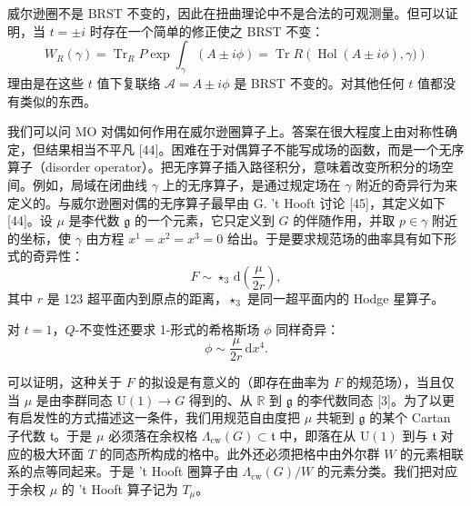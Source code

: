 \documentclass[11pt,a4paper,UTF8]{ctexart}
\begin{document}
威尔逊圈不是 BRST 不变的，因此在扭曲理论中不是合法的可观测量。但可以证明，当 $t=\pm i$ 时存在一个简单的修正使之 BRST 不变：
\[
    W_{R}(\gamma) = \operatorname{Tr}_{R} P\exp\int_{\gamma}(A\pm i\phi)
    = \operatorname{Tr} R\left(\operatorname{Hol}(A\pm i\phi),\gamma)\right)
\]
理由是在这些 $t$ 值下复联络 $\mathcal{A}=A\pm i\phi$ 是 BRST 不变的。对其他任何 $t$ 值都没有类似的东西。

我们可以问 MO 对偶如何作用在威尔逊圈算子上。答案在很大程度上由对称性确定，但结果相当不平凡 [44]。困难在于对偶算子不能写成场的函数，而是一个无序算子（disorder operator）。把无序算子插入路径积分，意味着改变所积分的场空间。例如，局域在闭曲线 $\gamma$ 上的无序算子，是通过规定场在 $\gamma$ 附近的奇异行为来定义的。与威尔逊圈对偶的无序算子最早由 G. 't Hooft 讨论 [45]，其定义如下 [44]。设 $\mu$ 是李代数 $\mathfrak{g}$ 的一个元素，它只定义到 $G$ 的伴随作用，并取 $p\in\gamma$ 附近的坐标，使 $\gamma$ 由方程 $x^{1}=x^{2}=x^{3}=0$ 给出。于是要求规范场的曲率具有如下形式的奇异性：
\[
    F\sim\star_{3}\,\mathrm{d}\left(\frac{\mu}{2r}\right),
\]
其中 $r$ 是 123 超平面内到原点的距离，$\star_{3}$ 是同一超平面内的 Hodge 星算子。


对 $t=1$，$Q$-不变性还要求 1-形式的希格斯场 $\phi$ 同样奇异：
\[
    \phi\sim\frac{\mu}{2r}\,\mathrm{d}x^{4}.
\]


可以证明，这种关于 $F$ 的拟设是有意义的（即存在曲率为 $F$ 的规范场），当且仅当 $\mu$ 是由李群同态 $\mathrm{U}(1)\to G$ 得到的、从 $\mathbb{R}$ 到 $\mathfrak{g}$ 的李代数同态 [3]。为了以更有启发性的方式描述这一条件，我们用规范自由度把 $\mu$ 共轭到 $\mathfrak{g}$ 的某个 Cartan 子代数 $\mathfrak{t}$。于是 $\mu$ 必须落在余权格 $\Lambda_{\mathrm{cw}}(G)\subset\mathfrak{t}$ 中，即落在从 $\mathrm{U}(1)$ 到与 $\mathfrak{t}$ 对应的极大环面 $T$ 的同态所构成的格中。此外还必须把格中由外尔群 $W$ 的元素相联系的点等同起来。于是 't Hooft 圈算子由 $\Lambda_{\mathrm{cw}}(G)/W$ 的元素分类。我们把对应于余权 $\mu$ 的 't Hooft 算子记为 $T_{\mu}$。

\end{document}
